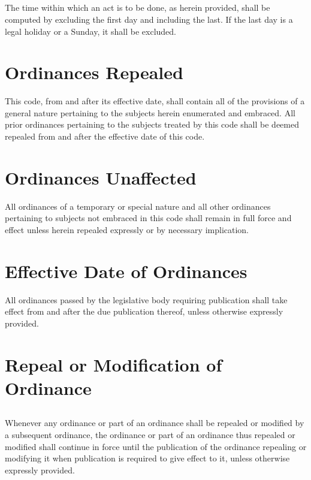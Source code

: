 \subsection{}
The time within which an act is to be done, as herein provided, shall be computed by excluding the first day and including the last.  If the last day is a legal holiday or a Sunday, it shall be excluded.



\section{Ordinances Repealed}
This code, from and after its effective date, shall contain all of the provisions of a general nature pertaining to the subjects herein enumerated and embraced.  All prior ordinances pertaining to the subjects treated by this code shall be deemed repealed from and after the effective date of this code.



\section{Ordinances Unaffected}
All ordinances of a temporary or special nature and all other ordinances pertaining to subjects not embraced in this code shall remain in full force and effect unless herein repealed expressly or by necessary implication.



\section{Effective Date of Ordinances}
All ordinances passed by the legislative body requiring publication shall take effect from and after the due publication thereof, unless otherwise expressly provided.



\section{Repeal or Modification of Ordinance}
\subsection{}
Whenever any ordinance or part of an ordinance shall be repealed or modified by a subsequent ordinance, the ordinance or part of an ordinance thus repealed or modified shall continue in force until the publication of the ordinance repealing or modifying it when publication is required to give effect to it, unless otherwise expressly provided.
